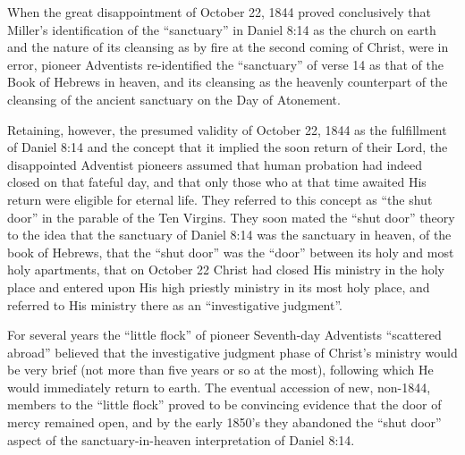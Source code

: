 When the great disappointment of October 22, 1844 proved conclusively that
Miller's identification of the ``sanctuary'' in Daniel 8:14 as the church on
earth and the nature of its cleansing as by fire at the second coming of
Christ,
 were in error, pioneer Adventists re-identified the ``sanctuary'' of
verse 14 as that of the Book of Hebrews in heaven, and its cleansing as the heavenly counterpart of the cleansing
of the ancient sanctuary on the Day of Atonement.

Retaining, however, the presumed validity of October 22, 1844 as the
fulfillment of Daniel 8:14 and the concept that it implied the soon return
of their Lord, the disappointed Adventist pioneers assumed that human
probation had indeed closed on that fateful day, and that only those who at 
that time awaited His return were eligible for eternal life. They referred
to this concept as ``the shut door'' in the parable of the Ten
Virgins.
 They
soon mated the ``shut door'' theory to the idea that the sanctuary of Daniel
8:14 was the sanctuary in heaven, of the book of Hebrews, that the ``shut
door'' was the ``door'' between its holy and most holy apartments, that on
October 22 Christ had closed His ministry in the holy place and entered upon
His high priestly ministry in its most holy place, and referred to His
ministry there as an ``investigative judgment''.

For several years the ``little flock'' of pioneer Seventh-day Adventists
``scattered abroad'' believed that the investigative judgment phase of
Christ's ministry would be very brief (not more than five years or so at the
most),
 following which He would immediately return to earth. The eventual
accession of new, non-1844, members to the ``little flock'' proved to be
convincing evidence that the door of mercy remained open, and by the early
1850's they abandoned the ``shut door'' aspect of the sanctuary-in-heaven
interpretation of Daniel 8:14.

